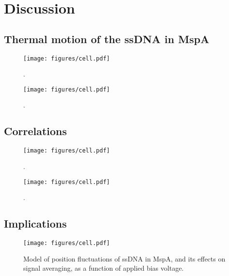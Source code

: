 \section{Discussion}

\subsection{Thermal motion of the ssDNA in MspA}

\begin{figure}[h]
\begin{centering}
\texttt{[image: figures/cell.pdf]}
\caption[Position fluctuations of ssDNA in MspA]{.}
\label{fig:position_fluctuations}
\end{centering}
\end{figure}

\begin{figure}[h]
\begin{centering}
\texttt{[image: figures/cell.pdf]}
\caption[Thermal motion averaging and sequencing data]{.}
\label{fig:thermal_motion}
\end{centering}
\end{figure}

\subsection{Correlations}

\begin{figure}[h]
\begin{centering}
\texttt{[image: figures/cell.pdf]}
\caption[Correlation between force and current]{.}
\label{fig:force_current_correlation}
\end{centering}
\end{figure}

\begin{figure}[h]
\begin{centering}
\texttt{[image: figures/cell.pdf]}
\caption[Correlation between diffusion and noise]{.}
\label{fig:diffusion_noise_correlation}
\end{centering}
\end{figure}

\subsection{Implications}

\begin{figure}[h]
\begin{centering}
\texttt{[image: figures/cell.pdf]}
\caption[Thermal motion averaging with voltage]{Model of position fluctuations of ssDNA in MspA, and its effects on signal averaging, as a function of applied bias voltage.}
\label{fig:thermal_motion_projections}
\end{centering}
\end{figure}
